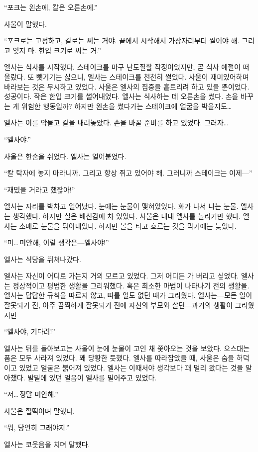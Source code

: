 ``포크는 왼손에, 칼은 오른손에.''

사울이 말했다.

``포크로는 고정하고, 칼로는 써는 거야. 끝에서 시작해서 가장자리부터 썰어야 해. 그리고 잊지 마. 한입 크기로 써는 거.''

엘사는 식사를 시작했다. 스테이크를 마구 난도질할 작정이었지만, 곧 식사 예절이 떠올랐다. 또 뺏기기는 싫으니, 엘사는 스테이크를 천천히 썰었다. 사울이 재미있어하며 바라보는 것은 무시하고 있었다. 사울은 엘사의 집중을 흩트리려 하고 있을 뿐이었다. 성공이다. 작은 한입 크기를 썰어내었다. 엘사는 식사하는 데 오른손을 썼다. 손을 바꾸는 게 위험한 행동일까? 하지만 왼손을 썼다가는 스테이크에 얼굴을 박을지도\ldots

엘사는 이를 악물고 칼을 내려놓았다. 손을 바꿀 준비를 하고 있었다. 그러자\ldots

``엘사야.''

사울은 한숨을 쉬었다. 엘사는 얼어붙었다.

``칼 탁자에 놓지 마라니까. 그리고 항상 쥐고 있어야 해. 그러니까 스테이크는 이제—''

``재밌을 거라고 했잖아!''

엘사는 자리를 박차고 일어났다. 눈에는 눈물이 맺혀있었다. 화가 나서 나는 눈물. 엘사는 생각했다. 하지만 실은 배신감에 차 있었다. 사울은 내내 엘사를 놀리기만 했다. 엘사는 소매로 눈물을 닦아내었다. 하지만 볼을 타고 흐르는 것을 막기에는 늦었다.

``미\ldots\,미안해, 이럴 생각은—엘사야!''

엘사는 식당을 뛰쳐나갔다.

엘사는 자신이 어디로 가는지 거의 모르고 있었다. 그저 어디든 가 버리고 싶었다. 엘사는 정상적이고 평범한 생활을 그리워했다. 혹은 최소한 마법이 나타나기 전의 생활을. 엘사는 답답한 규칙을 따르지 않고, 따를 일도 없던 때가 그리웠다. 엘사는—모든 일이 잘못되기 전, 아주 끔찍하게 잘못되기 전에 자신의 부모와 살던—과거의 생활이 그리웠지만—

``엘사야, 기다려!''

엘사는 뒤를 돌아보고는 사울이 눈에 눈물이 고인 채 쫓아오는 것을 보았다. 으스대는 품은 모두 사라져 있었다. 꽤 당황한 듯했다. 엘사를 따라잡았을 때, 사울은 숨을 허덕이고 있었고 얼굴은 붉어져 있었다. 엘사는 이때서야 생각보다 꽤 멀리 왔다는 것을 알아챘다. 발밑에 있던 얼음이 엘사를 밀어주고 있었다.

``저\ldots\,정말 미안해.''

사울은 헐떡이며 말했다.

``뭐, 당연히 그래야지.''

엘사는 코웃음을 치며 말했다.

